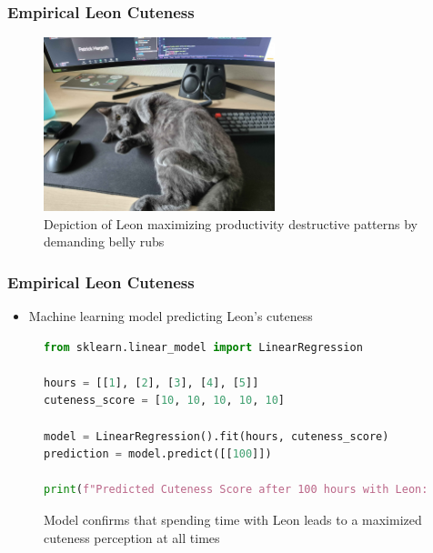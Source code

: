 \documentclass[compress]{beamer}
\begin{document}
\begin{frame}
\frametitle{Empirical Leon Cuteness}
\begin{center}
  \begin{figure}[h]
    \includegraphics[width=0.6\textwidth]{images/keyboard_leon.jpg} %
\caption{Depiction of Leon maximizing productivity destructive patterns by demanding belly rubs}
\label{fig:egypt_cat} %
  \end{figure}  

\end{center}
\end{frame}


\begin{frame}[fragile]
  \frametitle{Empirical Leon Cuteness}
  \begin{itemize}
    \item Machine learning model predicting Leon's cuteness
  \end{itemize}
  \begin{figure}
    
\begin{lstlisting}[language=Python, basicstyle=\scriptsize\ttfamily, keywordstyle=\color{blue}, commentstyle=\color{green}]
from sklearn.linear_model import LinearRegression

hours = [[1], [2], [3], [4], [5]]
cuteness_score = [10, 10, 10, 10, 10]

model = LinearRegression().fit(hours, cuteness_score)
prediction = model.predict([[100]])

print(f"Predicted Cuteness Score after 100 hours with Leon: {prediction[0]}")

\end{lstlisting}
\caption{Model confirms that spending time with Leon leads to a maximized cuteness perception at all times}

  \end{figure}
\end{frame}
\end{document}
